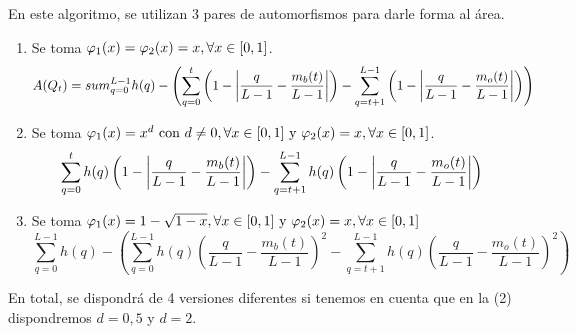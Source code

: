 En este algoritmo, se utilizan 3 pares de automorfismos para darle forma al área. 




\begin{enumerate}\label{enum:funcionesalg2}
    \item Se toma $\varphi_1(x) = \varphi_2(x) = x, \forall x\in[0,1]$.
    $$A(Q_t) = sum_{q=0}^{L-1} h(q) - \left(\sum_{q=0}^{t} \left(1-\left\vert\frac{q}{L-1}-\frac{m_b(t)}{L-1}\right\vert\right) - \sum_{q=t+1}^{L-1} \left(1-\left\vert\frac{q}{L-1}-\frac{m_o(t)}{L-1}\right\vert\right)\right)$$
    \item Se toma $\varphi_1(x) = x^d \text{ con } d\neq0, \forall x\in[0,1] \text{ y } \varphi_2(x)=x, \forall x\in[0,1]$.
    $$\sum_{q=0}^{t} h(q) \left(1-\left\vert\frac{q}{L-1}-\frac{m_b(t)}{L-1}\right\vert\right) - \sum_{q=t+1}^{L-1} h(q) \left(1-\left\vert\frac{q}{L-1}-\frac{m_o(t)}{L-1}\right\vert\right)$$
    \item Se toma $\varphi_1(x) = 1-\sqrt{1-x}, \forall x\in[0,1] \text{ y } \varphi_2(x)=x,\forall x\in[0,1]$
    $$\sum_{q=0}^{L-1} h(q) - \left(\sum_{q=0}^{L-1} h(q) \left(\frac{q}{L-1}-\frac{m_b(t)}{L-1}\right)^2 - \sum_{q=t+1}^{L-1} h(q) \left(\frac{q}{L-1}-\frac{m_o(t)}{L-1}\right)^2\right)$$
\end{enumerate}
En total, se dispondrá de 4 versiones diferentes si tenemos en cuenta que en la (2) dispondremos $d=0,5$ y $d=2$.

